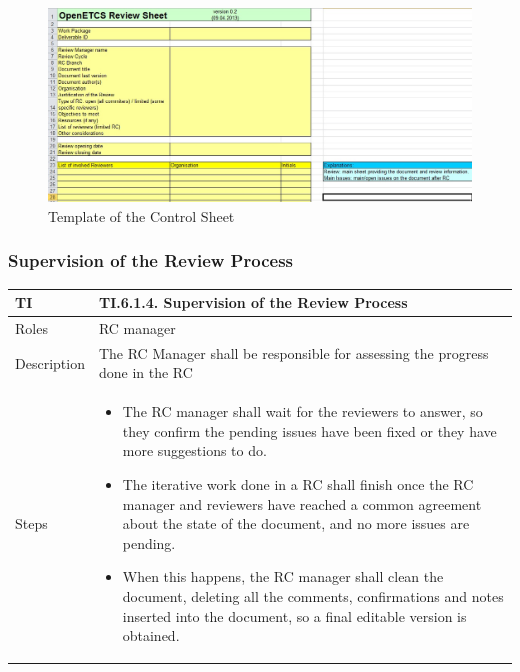 \documentclass{template/openetcs_article}
\begin{document}
\begin{figure}
\centering
\includegraphics [width=\textwidth]{./figures/ReviewSheet.JPG}
\caption{Template of the Control Sheet}
\end{figure}

\subsubsection{Supervision of the Review Process}

\begin{flushleft}
\tablefirsthead{}
\tablehead{}
\tabletail{}
\tablelasttail{}
\begin{supertabular}{|m{2cm}|m{13cm}|}
\hline
{}
TI & 
TI.6.1.4. Supervision of the Review Process
\\\hline
Roles &
RC manager
\\\hline
Description &
The RC Manager shall be responsible for assessing the progress done in the RC
\\\hline
Steps &
\begin{itemize}
\item The RC manager shall wait for the reviewers to answer, so they confirm the pending issues have been fixed or they have more suggestions to do.
\item The iterative work done in a RC shall finish once the RC manager and reviewers have reached a common agreement about the state of the document, and no more issues are pending. \item When this happens, the RC manager shall clean the document, deleting all the comments, confirmations and notes inserted into the document, so a final editable version is obtained.
\end{itemize}
\\\hline
\end{supertabular}
\end{flushleft}
\end{document}

